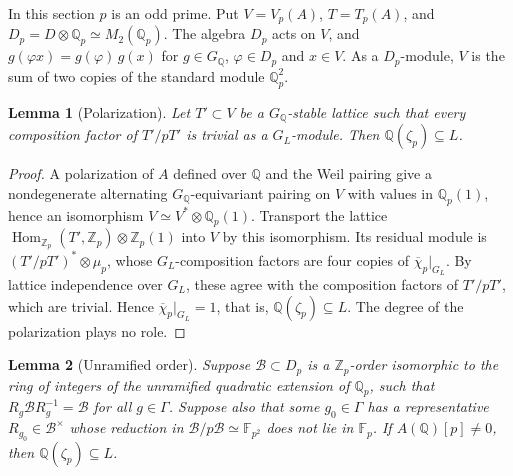 \documentclass[11pt]{article}
\newtheorem{lemma}{Lemma}
\newcommand{\Q}{\mathbb Q}
\newcommand{\Z}{\mathbb Z}
\newcommand{\F}{\mathbb F}
\DeclareMathOperator{\Hom}{Hom}
\begin{document}
In this section \(p\) is an odd prime. Put \(V=V_p(A)\), \(T=T_p(A)\),
and \(D_p=D\otimes\Q_p\simeq M_2(\Q_p)\). The algebra \(D_p\) acts on
\(V\), and \(g(\varphi x)=g(\varphi)\,g(x)\) for \(g\in G_{\Q}\),
\(\varphi\in D_p\) and \(x\in V\). As a \(D_p\)-module, \(V\) is the sum
of two copies of the standard module \(\Q_p^2\).

\begin{lemma}[Polarization]\label{lem:polarization}
Let \(T'\subset V\) be a \(G_{\Q}\)-stable lattice such that every
composition factor of \(T'/pT'\) is trivial as a \(G_L\)-module. Then
\(\Q(\zeta_p)\subseteq L\).
\end{lemma}

\begin{proof}
A polarization of \(A\) defined over \(\Q\) and the Weil pairing give a
nondegenerate alternating \(G_{\Q}\)-equivariant pairing on \(V\) with
values in \(\Q_p(1)\), hence an isomorphism
\(V\simeq V^*\otimes\Q_p(1)\). Transport the lattice
\(\Hom_{\Z_p}(T',\Z_p)\otimes\Z_p(1)\) into \(V\) by this isomorphism.
Its residual module is \((T'/pT')^*\otimes\mu_p\), whose
\(G_L\)-composition factors are four copies of
\(\overline\chi_p|_{G_L}\). By lattice independence over \(G_L\), these
agree with the composition factors of \(T'/pT'\), which are trivial.
Hence \(\overline\chi_p|_{G_L}=1\), that is,
\(\Q(\zeta_p)\subseteq L\). The degree of the polarization plays no
role.
\end{proof}

\begin{lemma}[Unramified order]\label{lem:unramified}
Suppose \(\mathcal B\subset D_p\) is a \(\Z_p\)-order isomorphic to the
ring of integers of the unramified quadratic extension of \(\Q_p\), such
that \(R_g\mathcal BR_g^{-1}=\mathcal B\) for all \(g\in\Gamma\).
Suppose also that some \(g_0\in\Gamma\) has a representative
\(R_{g_0}\in\mathcal B^\times\) whose reduction in
\(\mathcal B/p\mathcal B\simeq\F_{p^2}\) does not lie in \(\F_p\). If
\(A(\Q)[p]\neq0\), then \(\Q(\zeta_p)\subseteq L\).
\end{lemma}
\end{document}
